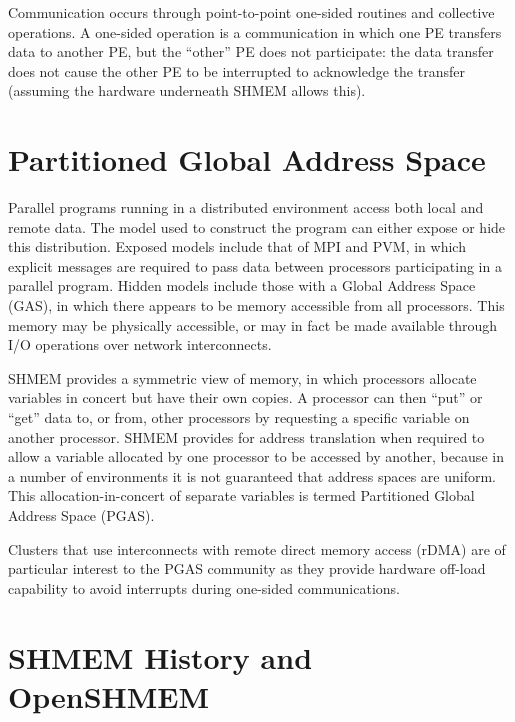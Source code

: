 \documentclass[english]{article}
\begin{document}
Communication occurs through point-to-point one-sided routines and
collective operations. A one-sided operation is a communication in
which one PE transfers data to another PE, but the ``other'' PE does
not participate: the data transfer does not cause the other PE to be
interrupted to acknowledge the transfer (assuming the hardware
underneath SHMEM allows this).

\section{Partitioned Global Address Space}

Parallel programs running in a distributed environment access both
local and remote data. The model used to construct the program can
either expose or hide this distribution. Exposed models include that
of MPI and PVM, in which explicit messages are required to pass data
between processors participating in a parallel program. Hidden models
include those with a Global Address Space (GAS), in which there
appears to be memory accessible from all processors. This memory may
be physically accessible, or may in fact be made available through I/O
operations over network interconnects.

SHMEM provides a symmetric view of memory, in which processors
allocate variables in concert but have their own copies. A processor
can then ``put'' or ``get'' data to, or from, other processors by
requesting a specific variable on another processor. SHMEM provides
for address translation when required to allow a variable allocated by
one processor to be accessed by another, because in a number of
environments it is not guaranteed that address spaces are
uniform. This allocation-in-concert of separate variables is termed
Partitioned Global Address Space (PGAS).

Clusters that use interconnects with remote direct memory access
(rDMA) are of particular interest to the PGAS community as they
provide hardware off-load capability to avoid interrupts during
one-sided communications.

\section{SHMEM History and OpenSHMEM}
\end{document}
